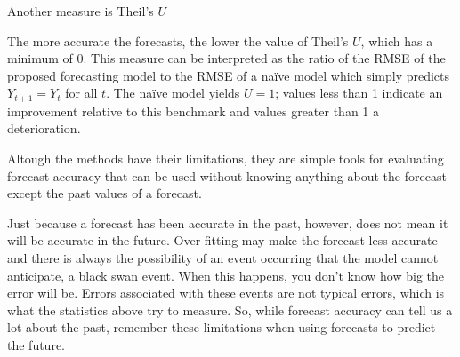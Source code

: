 Another measure is Theil's $U$\\
  

The more accurate the forecasts, the lower the value of Theil's $U$,   which has a minimum of 0. This measure can be interpreted as the ratio of the RMSE of the proposed forecasting model to the RMSE of  a na\"ive model which simply predicts $Y_{t+1} = Y_t$ for all $t$. The na\"ive model yields $U = 1$; values less than 1 indicate an  improvement relative to this benchmark and values greater than 1 a deterioration.

Altough the methods have their limitations, they are simple tools for evaluating forecast accuracy that can be used without knowing anything about the forecast except the past values of a forecast.

Just because a forecast has been accurate in the past, however, does not mean it will be accurate in the future. Over fitting may make the forecast less accurate and there is always the possibility of an event occurring that the model cannot anticipate, a black swan event. When this happens, you don’t know how big the error will be. Errors associated with these events are not typical errors, which is what the statistics above try to measure. So, while forecast accuracy can tell us a lot about the past, remember these limitations when using forecasts to predict the future.

\fi
